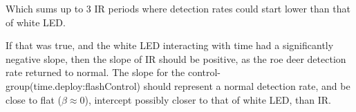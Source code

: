 Which sums up to 3 IR periods where detection rates could start lower than that of white LED.

If that was true, and the white LED interacting with time had a significantly negative slope, then the slope of IR should be positive, as the roe deer detection rate returned to normal.
The slope for the control-group(time.deploy:flashControl) should represent a normal detection rate, and be close to flat ($ \beta \approx 0$), intercept possibly closer to that of white LED, than IR.

